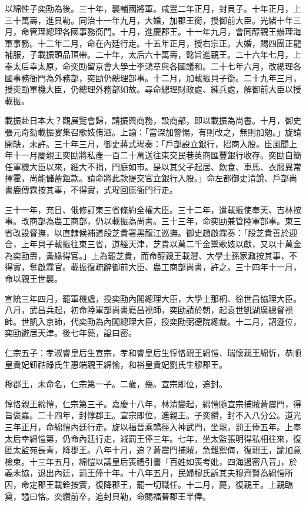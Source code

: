 \begin{pinyinscope}
以綿性子奕劻為後。三十年，襲輔國將軍。咸豐二年正月，封貝子。十年正月，上三十萬壽，進貝勒。同治十一年九月，大婚，加郡王銜，授御前大臣。光緒十年三月，命管理總理各國事務衙門。十月，進慶郡王。十一年九月，會同醇親王辦理海軍事務。十二年二月，命在內廷行走。十五年正月，授右宗正。大婚，賜四團正龍補服，子載振頭品頂帶。二十年，太后六十萬壽，懿旨進親王。二十六年七月，上奉太后幸太原，命奕劻留京會大學士李鴻章與各國議和。二十七年六月，改總理各國事務衙門為外務部，奕劻仍總理部事。十二月，加載振貝子銜。二十九年三月，授奕劻軍機大臣，仍總理外務部如故。尋命總理財政處、練兵處，解御前大臣以授載振。

載振赴日本大？觀展覽會歸，請振興商務，設商部，即以載振為尚書。十月，御史張元奇劾載振宴集召歌妓侑酒。上諭：「當深加警惕，有則改之，無則加勉。」旋請開缺，未許。三十年三月，御史蔣式瑆奏：「戶部設立銀行，招商入股。臣風聞上年十一月慶親王奕劻將私產一百二十萬送往東交民巷英商匯豐銀行收存。奕劻自簡任軍機大臣以來，細大不捐，門庭如市。是以其父子起居、飲食、車馬、衣服異常揮霍，尚能儲蓄鉅款。請命將此款提交官立銀行入股。」命左都御史清銳、戶部尚書鹿傳霖按其事，不得實，式瑆回原衙門行走。

三十一年，充日、俄修訂東三省條約全權大臣。三十二年，遣載振使奉天、吉林按事。改商部為農工商部，仍以載振為尚書。三十三年，命奕劻兼管陸軍部事。東三省改設督撫，以直隸候補道段芝貴署黑龍江巡撫。御史趙啟霖奏：「段芝貴善於迎合，上年貝子載振往東三省，道經天津，芝貴以萬二千金鬻歌妓以獻，又以十萬金為奕劻壽，夤緣得官。」上為罷芝貴，而命醇親王載灃、大學士孫家鼐按其事，不得實，奪啟霖官。載振復疏辭御前大臣、農工商部尚書，許之。三十四年十一月，命以親王世襲。

宣統三年四月，罷軍機處，授奕劻內閣總理大臣，大學士那桐、徐世昌協理大臣。八月，武昌兵起，初命陸軍部尚書廕昌視師，奕劻請於朝，起袁世凱湖廣總督視師。世凱入京師，代奕劻為內閣總理大臣，授奕劻弼德院總裁。十二月，詔遜位，奕劻避居天津。後七年薨，謚曰密。

仁宗五子：孝淑睿皇后生宣宗，孝和睿皇后生惇恪親王綿愷、瑞懷親王綿忻，恭順皇貴妃鈕祜祿氏生惠端親王綿愉，和裕皇貴妃劉氏生穆郡王。

穆郡王，未命名，仁宗第一子。二歲，殤。宣宗即位，追封。

惇恪親王綿愷，仁宗第三子。嘉慶十八年，林清變起，綿愷隨宣宗捕賊蒼震門，得旨褒嘉。二十四年，封惇郡王。宣宗即位，進親王。子奕纘，封不入八分公。道光三年正月，命綿愷內廷行走。旋以福晉乘轎徑入神武門，坐罷，罰王俸五年。上奉太后幸綿愷第，仍命內廷行走，減罰王俸三年。七年，坐太監張明得私相往來，復匿太監苑長青，降郡王。八年十月，追？蒼震門捕賊，急難禦侮，復親王，諭加意檢束。十三年五月，綿愷以議皇后喪禮引書「百姓如喪考妣，四海遏密八音」，於義未協，退出內廷，罰王俸十年。十八年五月，民婦穆氏訴其夫穆齊賢為綿愷所囚，命定郡王載銓按實，復降郡王，罷一切職任。十二月，薨，復親王。上親臨奠，謚曰恪。奕纘前卒，追封貝勒，命賜福晉郡王半俸。


\end{pinyinscope}
